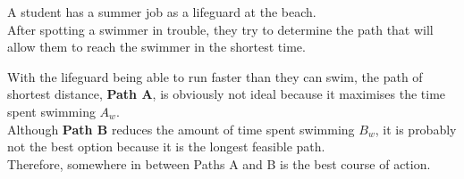 \documentclass[a4paper, 12pt]{report}
\def\ni{blue!20!white}
\begin{document}
    \newpage
    \begin{tcolorbox}[title={\color{black}{\section{Q7}}}, colback=white, colframe=\ni, boxrule=1mm, width=1\textwidth]
         A student has a summer job as a lifeguard at the beach.\\[8pt]
         After spotting a swimmer in trouble, they try to determine the path that will allow them to reach the swimmer in the shortest time.\\[1em] 
         \begin{minipage}{0.45\textwidth} 
            With the lifeguard being able to run faster than they can swim, the path of shortest distance, \textbf{Path A}, is obviously not ideal because it maximises the time spent swimming \(A_w\).\\[8pt]
            Although \textbf{Path B} reduces the amount of time spent swimming \(B_w\), it is probably not the best option because it is the longest feasible path.\\[8pt]
            Therefore, somewhere in between Paths A and B is the best course of action.
         \end{minipage}
         \begin{minipage}{0.4\textwidth}\centering
\end{minipage}
\end{tcolorbox}
\end{document}

